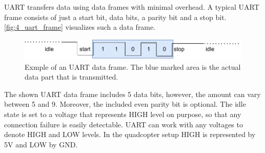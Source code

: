 \noindent UART transfers data using data frames with minimal overhead.
A typical UART frame consists of just a start bit, data bits, a parity bit and
a stop bit.
\autoref{fig:4_uart_frame} visualizes such a data frame. 
\begin{figure}[!h]
    \centering
    \includegraphics[scale=0.8]{uart_frame.pdf}
    \caption[UART data frame]{Exmple of an UART data frame. The blue marked
    area is the actual data part that is transmitted.}
    \label{fig:4_uart_frame}
\end{figure}
\FloatBarrier
\noindent The shown UART data frame includes 5 data bits, however, the amount
can vary between 5 and 9.
Moreover, the included even parity bit is optional.
The idle state is set to a voltage that represents HIGH level on purpose, so
that any connection failure is easily detectable.
UART can work with any voltages to denote HIGH and LOW levels.
In the quadcopter setup HIGH is represented by 5V and LOW by GND.

